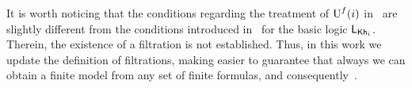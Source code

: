 \medskip

It is worth noticing that the conditions regarding the treatment of $\operatorname{U}^f(i)$ in~ are slightly different from the conditions introduced in~\cite{AFSVQ23report} for the basic logic $\mathsf{L}_{{\sf Kh}_i}$. Therein, the existence of a filtration is not established. Thus, in this work we update the definition of filtrations, making easier to guarantee that always we can obtain a finite model from any set of finite formulas, and consequently~.

